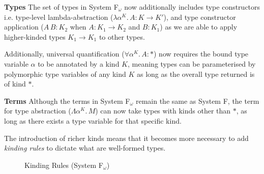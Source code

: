 \documentclass[acmsmall, 9pt]{article}
\begin{document}
\textbf{Types} The set of types in System F$_\omega$ now additionally includes type constructors i.e. type-level lambda-abstraction ($\lambda \alpha^K. \, A : K \rightarrow K'$), and type constructor application ($A\,B : K_2$ when $A : K_1 \rightarrow K_2$ and $B : K_1$) as we are able to apply higher-kinded types $K_1 \rightarrow K_1$ to other types.

Additionally, universal quantification ($\forall \alpha^K . \, A : *$) now requires the bound type variable $\alpha$ to be annotated by a kind $K$, meaning types can be parameterised by polymorphic type variables of any kind $K$ as long as the overall type returned is of kind $*$.

\textbf{Terms} Although the terms in System F$_\omega$ remain the same as System F, the term for type abstraction ($\Lambda \alpha^K . \, M$) can now take types with kinds other than $*$, as long as there exists a type variable for that specific kind.

\lbreak
The introduction of richer kinds means that it becomes more necessary to add \textit{kinding rules} to dictate what are well-formed types.

\begin{figure}[H]
\flushleft {}
\caption{Kinding Rules (System F$_\omega$)}
\end{figure}
\end{document}
